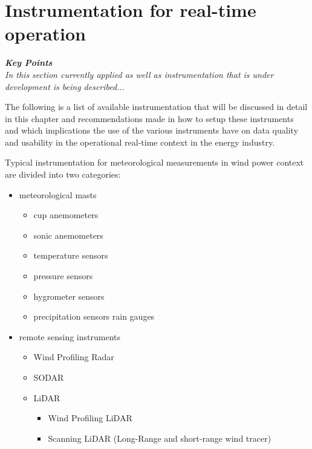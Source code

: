 \chapter{Instrumentation for real-time operation 
{\color{magenta}{Contributing author: COM, ES, JB}}}
    \label{ch:instrumentation}

\noindent
\begin{tcolorbox}
\parbox{\textwidth}{
\emph{\textbf{Key Points}\\
In this section currently applied as well as instrumentation that is under development is being described... 
}}
\end{tcolorbox}



The following is a list of available instrumentation that will be discussed in detail in this chapter and recommendations made in how to setup these instruments and which implications the use of the various instruments have on data quality and usability in the operational real-time context in the energy industry.

Typical instrumentation for meteorological measurements in wind power context are divided into two categories: 
\begin{itemize}
    \item meteorological masts
        \begin{itemize}
            \item cup anemometers
            \item sonic anemometers
             \item temperature sensors
             \item pressure sensors
             \item hygrometer sensors
             \item precipitation sensors rain gauges   
        \end{itemize}
    \item remote sensing instruments
        \begin{itemize}
            \item Wind Profiling Radar
            \item SODAR
            \item LiDAR 	
                \begin{itemize}
                    \item Wind Profiling LiDAR
                    \item Scanning LiDAR (Long-Range and short-range wind tracer)
                \end{itemize}
        \end{itemize}
\end{itemize}


